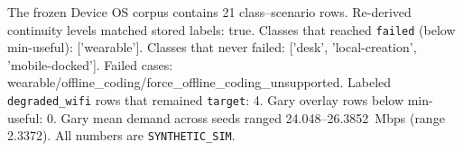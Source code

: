The frozen Device OS corpus contains 21 class--scenario rows. Re-derived continuity levels matched stored labels: true. Classes that reached \texttt{failed} (below min-useful): ['wearable']. Classes that never failed: ['desk', 'local-creation', 'mobile-docked']. Failed cases: wearable/offline\_coding/force\_offline\_coding\_unsupported. Labeled \texttt{degraded\_wifi} rows that remained \texttt{target}: 4. Gary overlay rows below min-useful: 0. Gary mean demand across seeds ranged 24.048--26.3852~Mbps (range 2.3372). All numbers are \texttt{SYNTHETIC\_SIM}.
